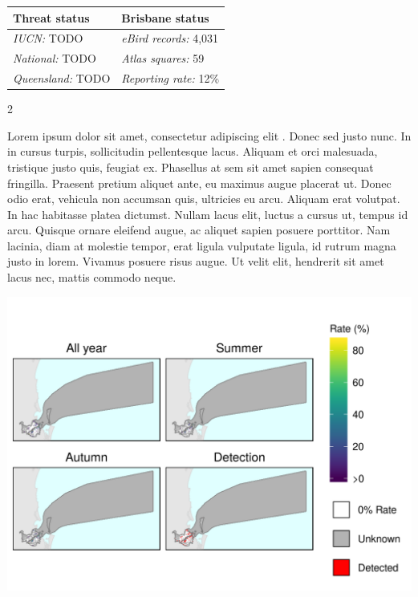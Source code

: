 \documentclass[12pt,openany,oneside]{book}
\let\origfigure\figure
\let\endorigfigure\endfigure
\renewenvironment{figure}[1][2] {
  \expandafter\origfigure\expandafter[H]
} {
  \endorigfigure
}
\let\Begin\begin
\let\End\end
\theoremstyle{definition}
\theoremstyle{definition}
\theoremstyle{definition}
\theoremstyle{remark}
\begin{document}
\begin{tabu} to 
\toprule
Threat status & Brisbane status\\
\midrule
\textit{IUCN:} TODO & \textit{eBird records:} 4,031\\
\textit{National:} TODO & \textit{Atlas squares:} 59\\
\textit{Queensland:} TODO & \textit{Reporting rate:} 12\%\\
\bottomrule
\end{tabu} 
\vspace{0.15cm}

\Begin{multicols}{2}

Lorem ipsum dolor sit amet, consectetur adipiscing elit
\citep{rexample1, rexample2, rexample3}. Donec sed justo nunc. In in
cursus turpis, sollicitudin pellentesque lacus. Aliquam et orci
malesuada, tristique justo quis, feugiat ex. Phasellus at sem sit amet
sapien consequat fringilla. Praesent pretium aliquet ante, eu maximus
augue placerat ut. Donec odio erat, vehicula non accumsan quis,
ultricies eu arcu. Aliquam erat volutpat. In hac habitasse platea
dictumst. Nullam lacus elit, luctus a cursus ut, tempus id arcu. Quisque
ornare eleifend augue, ac aliquet sapien posuere porttitor. Nam lacinia,
diam at molestie tempor, erat ligula vulputate ligula, id rutrum magna
justo in lorem. Vivamus posuere risus augue. Ut velit elit, hendrerit
sit amet lacus nec, mattis commodo neque.

\End{multicols}

\clearpage

\begin{figure}
\centering
\includegraphics[height=0.47\textheight,width=\textwidth,keepaspectratio=true]{assets/maps/Anas-gracilis.png}
\end{figure}
\end{document}
